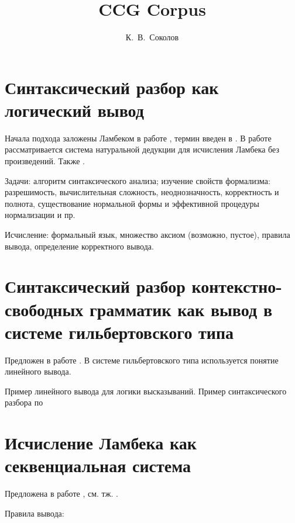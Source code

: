 \documentclass[a4paper,12pt]{article}
\title{CCG Corpus}
\author{К.~В.~Соколов}
\date{}
\begin{document}
\maketitle

\section*{Синтаксический разбор как логический вывод}

Начала подхода заложены Ламбеком в работе \cite{lambek1958mathematics}, термин введен в \cite{pereira1983parsing}. В работе \cite{konig1989parsing} рассматривается система натуральной дедукции для исчисления Ламбека без произведений. Также \cite{moot2012logic}.

Задачи: алгоритм синтаксического анализа; изучение свойств формализма: разрешимость, вычислительная сложность, неоднозначность, корректность и полнота, существование нормальной формы и эффективной процедуры нормализации и пр.

Исчисление: формальный язык, множество аксиом (возможно, пустое), правила вывода, определение корректного вывода.

\section*{Синтаксический разбор контекстно-свободных грамматик как вывод в системе гильбертовского типа}

Предложен в работе \cite{pereira1983parsing}. В системе гильбертовского типа используется понятие линейного вывода.

Пример линейного вывода для логики высказываний.
Пример синтаксического разбора по \cite{kallmeyer2010parsing}

\section*{Исчисление Ламбека как секвенциальная система}

Предложена в работе \cite{lambek1958mathematics}, см. тж. \cite{moot2012logic}.

Правила вывода:


\begin{prooftree}
\end{prooftree}

\begin{prooftree}
\end{prooftree}
\end{document}
